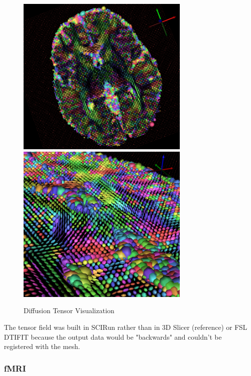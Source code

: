 \begin{figure}[p]
\begin{center}
\includegraphics[width=0.75\textwidth]{Figures/DTI_1.png}
\includegraphics[width=0.75\textwidth]{Figures/DTI_2.png}
\caption{Diffusion Tensor Visualization}
\label{fig:tensorvis}
\end{center}
\end{figure}

The tensor field was built in SCIRun rather than in 3D Slicer (reference) or FSL DTIFIT because the output data would be "backwards" and couldn't be registered with the mesh. 

\subsubsection{fMRI}
\label{sec:fmripre}

